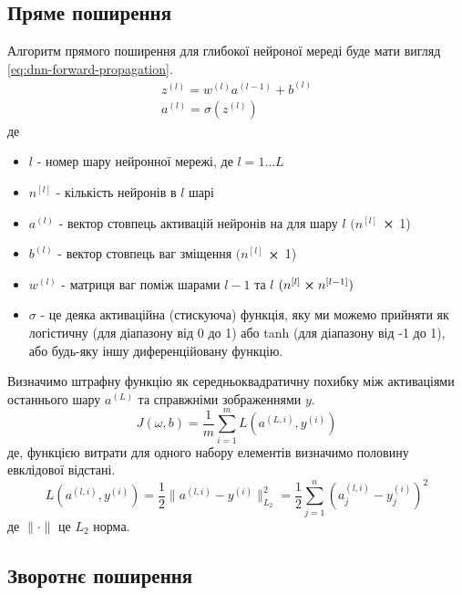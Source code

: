 \documentclass[14pt,a4paper]{extarticle}
\newcounter{e}
\numberwithin{equation}{section}
\numberwithin{figure}{section}
\newcommand{\ith}{^{(i)}}
\newcommand{\lth}{^{(l)}}
\begin{document}
	\subsection{Пряме поширення}
	Алгоритм прямого поширення для глибокої нейроної мереді буде мати вигляд \ref{eq:dnn-forward-propagation}.
	\begin{equation}
		\label{eq:dnn-forward-propagation}
		\begin{array}{l}
			\displaystyle
			z\lth=w^{(l)} a^{(l-1)}+b\lth
			\\[0.7cm]
			
			\displaystyle
			a\lth=\sigma (z\lth)
		\end{array}
	\end{equation}
	де
	\begin{itemize}
		\item $l$ - номер шару нейронної мережі, де $l = 1 \dotsc L$
		\item $n^{[l]}$ - кількість нейронів в $l$ шарі
		\item $a\lth$ - вектор стовпець активацій нейронів на для шару $l$ $(n^{[l]}$ $\cross$ 1)
		\item $b\lth$ - вектор стовпець ваг зміщення $(n^{[l]}$ $\cross$ 1)
		\item $w\lth$ - матриця ваг поміж шарами $l-1$ та $l$ $(n^{[l]} \cross n^{[l - 1]})$ 
		\item $\sigma$ - це деяка активаційна (стискуюча) функція, яку ми можемо прийняти як логістичну (для діапазону від 0 до 1) або tanh (для діапазону від -1 до 1), або будь-яку іншу диференційовану функцію.
	\end{itemize}
	
	Визначимо штрафну функцію як середньоквадратичну похибку між активаціями останнього шару $a^{(L)}$ та справжніми зображеннями $y$.
	\begin{equation}
		\label{eq:cost-function}
		J(\omega, b) =  \frac{1}{m}  \sum_{i=1}^{m} L(a^{(L, i)}, y\ith)
	\end{equation}
	де, функцією витрати для одного набору елементів визначимо половину евклідової відстані.
	\begin{equation}
		\label{eq:loss-function}
		L(a^{(l, i)}, y\ith)  =  \frac{1}{2}  \| a^{(l, i)}  - y\ith \|_{L_2}^{2} = \frac{1}{2} \sum_{j=1}^{n}  (a^{(l, i)}_j -  y\ith_j)^2
	\end{equation}
	де $\| \cdot \|$ це $L_2$ норма.

	\subsection{Зворотнє поширення}
	
\end{document}

